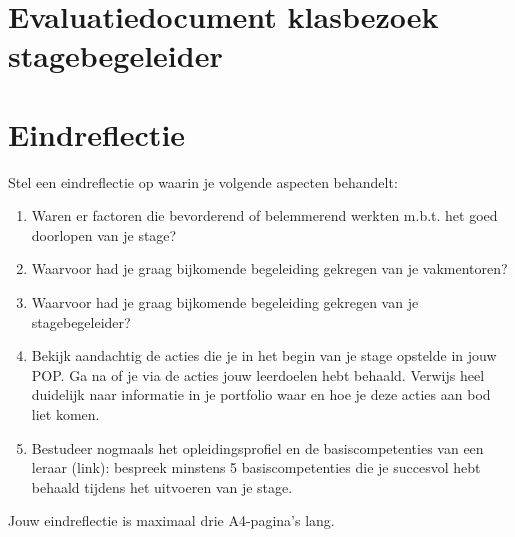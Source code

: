 \documentclass[a4paper,12pt,twoside]{article}%
\begin{document}
	
	
	
	
	
	
	

	
	
	
	\section{Evaluatiedocument klasbezoek stagebegeleider}
	
	
	\newpage
	\section{Eindreflectie}
	Stel een eindreflectie op waarin je volgende aspecten behandelt: 
	\begin{enumerate}
		\item Waren er factoren die bevorderend of belemmerend werkten m.b.t. het goed doorlopen van je stage? 
	\item Waarvoor had je graag bijkomende begeleiding gekregen van je vakmentoren? 
	\item Waarvoor had je graag bijkomende begeleiding gekregen van je stagebegeleider? 
	\item Bekijk aandachtig de acties die je in het begin van je stage opstelde in jouw POP. Ga na of je via de acties jouw leerdoelen hebt behaald. Verwijs heel duidelijk naar informatie in je portfolio waar en hoe je deze acties aan bod liet komen. 
	\item  Bestudeer nogmaals het opleidingsprofiel en de basiscompetenties van een leraar (link):  bespreek minstens 5 basiscompetenties die je succesvol hebt behaald tijdens het uitvoeren van je stage. 
	\end{enumerate} 
Jouw eindreflectie is maximaal drie A4-pagina’s lang.\newline\newline
	
\end{document}
